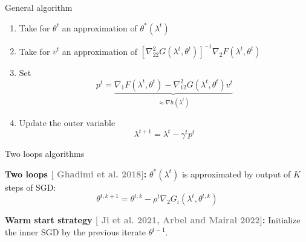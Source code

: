 \documentclass{beamer}
\newcommand{\citeline}[1]{\textcolor{gray}{\small[{\color{linkcolor} #1}]}}
\begin{document}
\begin{frame}{General algorithm}

    \begin{algorithm}[H]

        {
        \begin{enumerate}
            \item Take for $\theta^t$ an approximation of $\theta^*(\lambda^t)$

            \item Take for $v^t$ an approximation of $\left[\nabla^2_{22}G(\lambda^t, \theta^t)\right]^{-1}\nabla_2 F(\lambda^t, \theta^t)$

            \item Set
            $$p^t = \underbrace{\nabla_1 F(\lambda^t, \theta^t) - \nabla_{12}^2 G(\lambda^t, \theta^t)v^t}_{\approx \nabla h(\lambda^t)}$$

            \item Update the outer variable
            $$\lambda^{t+1} = \lambda^t - \gamma^t p^t$$
        \end{enumerate}
        }
    \end{algorithm}
\end{frame}


\begin{frame}{Two loops algorithms}

    \textbf{Two loops \citeline{Ghadimi et al. 2018}: } $\theta^*(\lambda^t)$ is approximated by output of $K$ steps of SGD:
    $$
    \theta^{t,k+1} = \theta^{t, k} - \rho^t\nabla_2 G_i(\lambda^t, \theta^{t, k})
    $$

    \vspace{.5cm}
    \textbf{Warm start strategy \citeline{Ji et al. 2021, Arbel and Mairal 2022}:} Initialize the inner SGD by the previous iterate $\theta^{t-1}$.

\end{frame}
\end{document}
